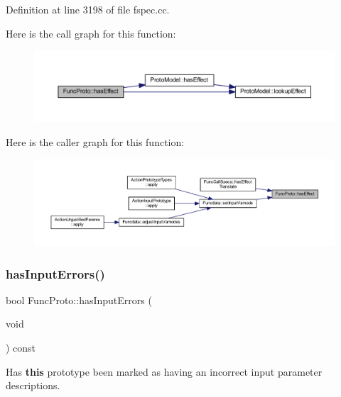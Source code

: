 Definition at line 3198 of file fspec.\+cc.

Here is the call graph for this function\+:
\nopagebreak
\begin{figure}[H]
\begin{center}
\leavevmode
\includegraphics[width=350pt]{class_func_proto_a906c0e176919bd0ced34e337445c2bf7_cgraph}
\end{center}
\end{figure}
Here is the caller graph for this function\+:
\nopagebreak
\begin{figure}[H]
\begin{center}
\leavevmode
\includegraphics[width=350pt]{class_func_proto_a906c0e176919bd0ced34e337445c2bf7_icgraph}
\end{center}
\end{figure}
\mbox{\label{class_func_proto_abeba6c216afa6ad43160d69a10433fab}} 
\subsubsection{\texorpdfstring{hasInputErrors()}{hasInputErrors()}}
{\footnotesize\ttfamily bool Func\+Proto\+::has\+Input\+Errors (\begin{DoxyParamCaption}\item[{void}]{ }\end{DoxyParamCaption}) const\hspace{0.3cm}{\ttfamily [inline]}}



Has {\bfseries{this}} prototype been marked as having an incorrect input parameter descriptions. 



